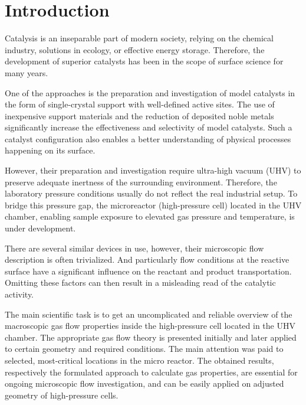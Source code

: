 \section*{Introduction}
	Catalysis is an inseparable part of modern society, relying on the chemical industry, solutions in ecology, or effective energy storage.
	Therefore, the development of superior catalysts has been in the scope of surface science for many years. 

	One of the approaches is the preparation and investigation of model catalysts in the form of single-crystal support with well-defined active sites.
	The use of inexpensive support materials and the reduction of deposited noble metals significantly increase the effectiveness and selectivity of model catalysts.
	Such a catalyst configuration also enables a better understanding of physical processes happening on its surface. 

	However, their preparation and investigation require ultra-high vacuum (UHV) to preserve adequate inertness of the surrounding environment.
	Therefore, the laboratory pressure conditions usually do not reflect the real industrial setup. To bridge this pressure gap, the microreactor (high-pressure cell) located in the UHV chamber, enabling sample exposure to elevated gas pressure and temperature, is under development. 

	There are several similar devices in use, however, their microscopic flow description is often trivialized.
	And particularly flow conditions at the reactive surface have a significant influence on the reactant and product transportation.
	Omitting these factors can then result in a misleading read of the catalytic activity. 

	The main scientific task is to get an uncomplicated and reliable overview of the macroscopic gas flow properties inside the high-pressure cell located in the UHV chamber.
	The appropriate gas flow theory is presented initially and later applied to certain geometry and required conditions.
	The main attention was paid to selected, most-critical locations in the micro reactor.
	The obtained results, respectively the formulated approach to calculate gas properties, are essential for ongoing microscopic flow investigation, and can be easily applied on adjusted geometry of high-pressure cells. 
